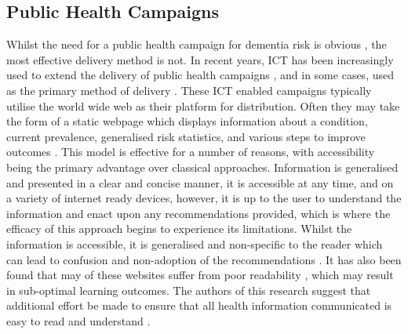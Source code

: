  \subsection{Public Health Campaigns}
Whilst the need for a public health campaign for dementia risk is obvious \cite{cook2014public}, the most effective delivery method is not. In recent years, ICT has been increasingly used to extend the delivery of public health campaigns \cite{Mirarchi2015}, and in some cases, used as the primary method of delivery \cite{Hattink2015}. These ICT enabled campaigns typically utilise the world wide web as their platform for distribution. Often they may take the form of a static webpage which displays information about a condition, current prevalence, generalised risk statistics, and various steps to improve outcomes \cite{AlzheimersAssociation2015a}. This model is effective for a number of reasons, with accessibility being the primary advantage over classical approaches. Information is generalised and presented in a clear and concise manner, it is accessible at any time, and on a variety of internet ready devices, however, it is up to the user to understand the information and enact upon any recommendations provided, which is where the efficacy of this approach begins to experience its limitations. Whilst the information is accessible, it is generalised and non-specific to the reader which can lead to confusion and non-adoption of the recommendations \cite{lerouge2014challenges, Tones1994}. It has also been found that may of these websites suffer from poor readability \cite{RisoldiCochrane2012}, which may result in sub-optimal learning outcomes. The authors of this research suggest that additional effort be made to ensure that all health information communicated is easy to read and understand \cite{RisoldiCochrane2012}.

